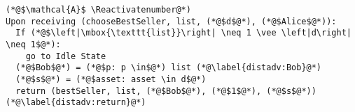 \Suppressnumber
\begin{lstlisting}[label=distadv, style=numbers]
(*@$\mathcal{A}$ \Reactivatenumber@*)
Upon receiving (chooseBestSeller, list, (*@$d$@*), (*@$Alice$@*)):
  If (*@$\left|\mbox{\texttt{list}}\right| \neq 1 \vee \left|d\right| \neq 1$@*):
    go to Idle State
  (*@$Bob$@*) = (*@$p: p \in$@*) list (*@\label{distadv:Bob}@*)
  (*@$s$@*) = (*@$asset: asset \in d$@*)
  return (bestSeller, list, (*@$Bob$@*), (*@$1$@*), (*@$s$@*)) (*@\label{distadv:return}@*)
\end{lstlisting}

